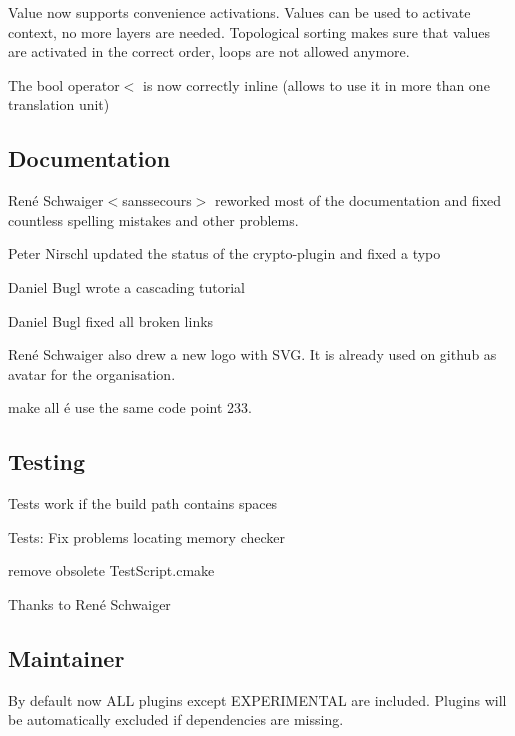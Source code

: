 Value now supports convenience activations. Values can be used to activate context, no more layers are needed. Topological sorting makes sure that values are activated in the correct order, loops are not allowed anymore.

The {\ttfamily bool operator$<$} is now correctly inline (allows to use it in more than one translation unit)

\subsection*{Documentation}

René Schwaiger$<$sanssecours$>$ reworked most of the documentation and fixed countless spelling mistakes and other problems.


\begin{DoxyItemize}
\item Peter Nirschl updated the status of the crypto-\/plugin and fixed a typo
\item Daniel Bugl wrote a cascading tutorial
\item Daniel Bugl fixed all broken links
\item René Schwaiger also drew a new logo with S\+V\+G. It is already used on github as avatar for the organisation.
\item make all é use the same code point 233.
\end{DoxyItemize}

\subsection*{Testing}


\begin{DoxyItemize}
\item Tests work if the build path contains spaces
\item Tests\+: Fix problems locating memory checker
\item remove obsolete Test\+Script.\+cmake
\end{DoxyItemize}

Thanks to René Schwaiger

\subsection*{Maintainer}

By default now A\+L\+L plugins except E\+X\+P\+E\+R\+I\+M\+E\+N\+T\+A\+L are included. Plugins will be automatically excluded if dependencies are missing.

